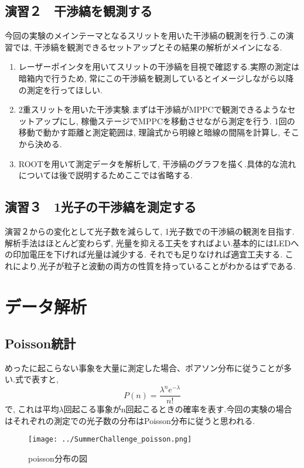 \documentclass[uplatex,10pt,a4j]{jsarticle}
\begin{document}
\subsection{演習２　干渉縞を観測する}
今回の実験のメインテーマとなるスリットを用いた干渉縞の観測を行う.この演習では, 干渉縞を観測できるセットアップとその結果の解析がメインになる.
\begin{enumerate}
  \item レーザーポインタを用いてスリットの干渉縞を目視で確認する.実際の測定は暗箱内で行うため, 常にこの干渉縞を観測しているとイメージしながら以降の測定を行ってほしい.
  \item 2重スリットを用いた干渉実験.まずは干渉縞がMPPCで観測できるようなセットアップにし, 稼働ステージでMPPCを移動させながら測定を行う.
  1回の移動で動かす距離と測定範囲は, 理論式から明線と暗線の間隔を計算し, そこから決める.
  \item ROOTを用いて測定データを解析して, 干渉縞のグラフを描く.具体的な流れについては後で説明するためここでは省略する.
\end{enumerate}

\subsection{演習３　1光子の干渉縞を測定する}
演習２からの変化として光子数を減らして, 1光子数での干渉縞の観測を目指す.解析手法はほとんど変わらず, 光量を抑える工夫をすればよい.基本的にはLEDへの印加電圧を下げれば光量は減少する. それでも足りなければ適宜工夫する.
これにより,光子が粒子と波動の両方の性質を持っていることがわかるはずである.
\clearpage



\clearpage



\clearpage
\section{データ解析}


\clearpage


\clearpage
\subsection{Poisson統計}
めったに起こらない事象を大量に測定した場合、ポアソン分布に従うことが多い.式で表すと, 
\begin{equation}
  P\left(n\right)=\frac{\lambda^n e^{-\lambda}}{n!}
\end{equation}
で, これは平均$\lambda$回起こる事象がn回起こるときの確率を表す.今回の実験の場合はそれぞれの測定での光子数の分布はPoisson分布に従うと思われる.
\begin{figure}[h]
  \begin{center}
    \texttt{[image: ../SummerChallenge\_poisson.png]}
    \caption{poisson分布の図}
    \label{fig:poisson}
  \end{center}
\end{figure}
\end{document}
